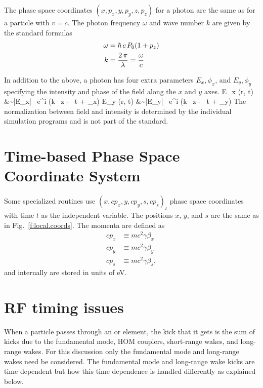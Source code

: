The phase space coordinates $(x, p_x, y, p_y, z, p_z)$ for a photon
are the same as for a particle with $v = c$. The photon frequency $\omega$ and
wave number $k$ are given by the standard formulas
\begin{align}
  \omega &= \hbar \, c \, P_0 (1 + p_z) \nonumber \\
  k &= \frac{2 \, \pi}{\lambda} = \frac{\omega}{c}
\end{align}

In addition to the above, a photon has
four extra parameters $E_x, \phi_x$, and $E_y, \phi_y$ specifying the
intensity and phase of the field along the $x$ and $y$ axes.
\Begineqs
  E_x (\Bf r, t) &\sim |E_x| \, e^{i (k \, z - \omega \, t + \phi_x)} \CRNO
  E_y (\Bf r, t) &\sim |E_y| \, e^{i (k \, z - \omega \, t + \phi_y)} \CRNO
\Endeqs
The normalization between field and intensity is determined by the
individual simulation programs and is not part of the \bmad standard.

\section{Time-based Phase Space Coordinate System}
\label{s:time.phase.space}

Some specialized routines use $(x, c p_x, y, c p_y, s, c p_s)_t$ phase space coordinates with time $t$ as the independent variable. The positions $x$, $y$, and $s$ are the same as in Fig.~\ref{f:local.coords}. The momenta are defined as  
\begin{align}
c p_x &\equiv m c^2 \gamma \beta_x \\
c p_y &\equiv m c^2 \gamma \beta_y \\
c p_s &\equiv m c^2 \gamma \beta_s,
\end{align}
and internally are stored in units of eV.

\section{RF timing issues}
\label{s:rf.time}

When a particle passes through an  or 
element, the kick that it gets is the sum of kicks due to the
fundamental mode, HOM couplers, short-range wakes, and long-range
wakes. For this discussion only the fundamental mode and long-range
wakes need be considered. The fundamental mode and long-range wake
kicks are time dependent but how this time dependence is handled 
differently as explained below.

